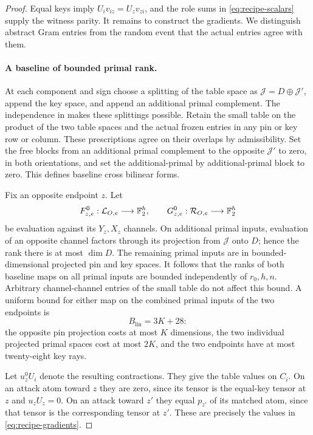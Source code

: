 \begin{proof}
Equal keys imply
$U_iv_{iz}=U_zv_{zi}$, and the role sums in
\eqref{eq:recipe-scalars} supply the witness parity.
It remains to construct the gradients.  We distinguish
abstract Gram entries from the random event that the actual
entries agree with them.

\paragraph{A baseline of bounded primal rank.}
At each component and sign choose a splitting of the table
space as $\mathcal J=D\oplus\mathcal J'$, append the key
space, and append an additional primal complement.
The independence in  makes these
splittings possible.  Retain the small table on the product
of the two table spaces and the actual frozen entries in any
pin or key row or column.  These prescriptions agree on their
overlaps by admissibility.  Set the free blocks from an
additional primal complement to the opposite $\mathcal J'$
to zero, in both orientations, and set the additional-primal
by additional-primal block to zero.  This defines baseline
cross bilinear forms.

Fix an opposite endpoint $z$.  Let
\[
 F^0_{z,e}:\mathcal L_{O,e}\longrightarrow\mathbb F_2^h,\qquad
 G^0_{z,e}:\mathcal R_{O,e}\longrightarrow\mathbb F_2^h
\]
be evaluation against its $Y_z,X_z$ channels.  On additional
primal inputs, evaluation of an opposite channel factors
through its projection from $\mathcal J$ onto $D$; hence the
rank there is at most $\dim D$.  The remaining primal inputs
are in bounded-dimensional projected pin and key spaces.
It follows that the ranks of both baseline maps on all primal
inputs are bounded independently of $r_0,h,n$.  Arbitrary
channel-channel entries of the small table do not affect this
bound.  A uniform bound for either map on the combined primal
inputs of the two endpoints is
\begin{equation}\label{eq:baseline-rank-bound}
 B_{\mathrm{lin}}=3K+28:
\end{equation}
the opposite pin projection costs at most $K$ dimensions,
the two individual projected primal spaces cost at most $2K$,
and the two endpoints have at most twenty-eight key rays.

Let $u_z^0U_i$ denote the resulting contractions.  They give
the table values on $C_i$.  On an attack atom toward $z$ they
are zero, since its tensor is the equal-key tensor at $z$ and
$u_zU_z=0$.  On an attack toward $z'$ they equal
$p_{z'}$ of its matched atom, since that tensor is the
corresponding tensor at $z'$.  These are precisely the values
in \eqref{eq:recipe-gradients}.


\end{proof}
